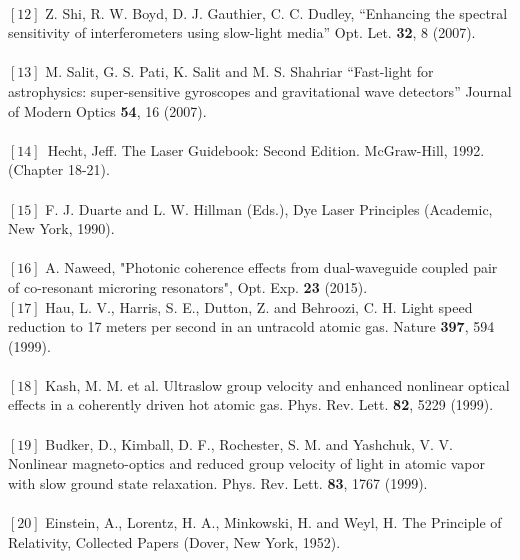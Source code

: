 {\\ $[12]$  Z. Shi, R. W. Boyd, D. J. Gauthier, C. C. Dudley, “Enhancing the spectral sensitivity of interferometers
using slow-light media” Opt. Let. \textbf{32}, 8 (2007).\\
\\ $[13]$  M. Salit, G. S. Pati, K. Salit and M. S. Shahriar “Fast-light for astrophysics: super-sensitive gyroscopes and gravitational wave detectors” Journal of Modern Optics \textbf{54}, 16 (2007).\\
\\ $[14]$\,  Hecht, Jeff. The Laser Guidebook: Second Edition. McGraw-Hill, 1992. (Chapter 18-21).\\
\\ $[15]$  F. J. Duarte and L. W. Hillman (Eds.), Dye Laser Principles (Academic, New York, 1990).\\
\\ $[16]$ A. Naweed, "Photonic coherence effects from dual-waveguide coupled pair of co-resonant microring resonators", Opt. Exp. \textbf{23} (2015).
\\ $[17]$ Hau, L. V., Harris, S. E., Dutton, Z. and Behroozi, C. H. Light speed reduction to 17 meters per second in
an untracold atomic gas. Nature \textbf{397}, 594 (1999).\\
\\ $[18]$  Kash, M. M. et al. Ultraslow group velocity and enhanced nonlinear optical effects in a coherently
driven hot atomic gas. Phys. Rev. Lett. \textbf{82}, 5229 (1999).\\
\\ $[19]$ Budker, D., Kimball, D. F., Rochester, S. M. and Yashchuk, V. V. Nonlinear magneto-optics and reduced
group velocity of light in atomic vapor with slow ground state relaxation. Phys. Rev. Lett. \textbf{83}, 1767 (1999).\\
\\ $[20]$ Einstein, A., Lorentz, H. A., Minkowski, H. and Weyl, H. The Principle of Relativity, Collected Papers
(Dover, New York, 1952).}